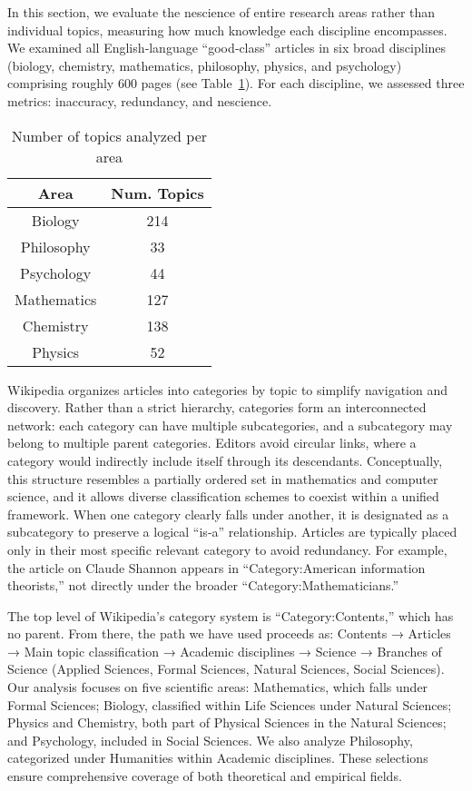 In this section, we evaluate the nescience of entire research areas rather than individual topics, measuring how much knowledge each discipline encompasses. We examined all English‑language “good‑class” articles in six broad disciplines (biology, chemistry, mathematics, philosophy, physics, and psychology) comprising roughly 600 pages (see Table \ref{tab:num_topics_per_area}). For each discipline, we assessed three metrics: inaccuracy, redundancy, and nescience.

\begin{table}
\begin{centering}
\begin{tabular}{|c|c|}
\hline 
Area & Num. Topics \tabularnewline
\hline 
\hline
Biology & 214 \tabularnewline
\hline
Philosophy & 33 \tabularnewline
\hline
Psychology & 44 \tabularnewline
\hline
Mathematics & 127 \tabularnewline
\hline
Chemistry & 138 \tabularnewline
\hline
Physics & 52 \tabularnewline
\hline
\end{tabular}
\par\end{centering}
\caption{\label{tab:num_topics_per_area}Number of topics analyzed per area}
\end{table}

Wikipedia organizes articles into categories by topic to simplify navigation and discovery. Rather than a strict hierarchy, categories form an interconnected network: each category can have multiple subcategories, and a subcategory may belong to multiple parent categories. Editors avoid circular links, where a category would indirectly include itself through its descendants. Conceptually, this structure resembles a partially ordered set in mathematics and computer science, and it allows diverse classification schemes to coexist within a unified framework. When one category clearly falls under another, it is designated as a subcategory to preserve a logical “is‑a” relationship. Articles are typically placed only in their most specific relevant category to avoid redundancy. For example, the article on Claude Shannon appears in “Category:American information theorists,” not directly under the broader “Category:Mathematicians.”

The top level of Wikipedia’s category system is “Category:Contents,” which has no parent. From there, the path we have used proceeds as: Contents → Articles → Main topic classification → Academic disciplines → Science → Branches of Science (Applied Sciences, Formal Sciences, Natural Sciences, Social Sciences). Our analysis focuses on five scientific areas: Mathematics, which falls under Formal Sciences; Biology, classified within Life Sciences under Natural Sciences; Physics and Chemistry, both part of Physical Sciences in the Natural Sciences; and Psychology, included in Social Sciences. We also analyze Philosophy, categorized under Humanities within Academic disciplines. These selections ensure comprehensive coverage of both theoretical and empirical fields.

